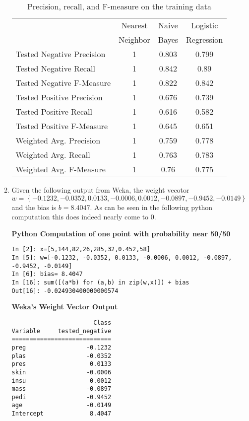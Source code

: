 \documentclass[12pt]{article}
\begin{document}
\begin{enumerate}
\begin{enumerate}
\begin{table}[htdp]
\caption{Precision, recall, and F-measure on the training data}
\begin{center}
\begin{tabular}{l||c|c|c|}
               & Nearest & Naive & Logistic  \\
               & Neighbor &  Bayes & Regression  \\
               \hline
Tested Negative Precision & 1 & 0.803 & 0.799 \\
Tested Negative Recall &1  &  0.842 & 0.89 \\
Tested Negative F-Measure &  1& 0.822 & 0.842 \\
Tested Positive Precision & 1 & 0.676 & 0.739 \\
Tested Positive Recall &1  & 0.616 & 0.582 \\
Tested Positive F-Measure &  1 & 0.645 & 0.651 \\
Weighted Avg. Precision & 1 & 0.759 & 0.778\\
Weighted Avg. Recall & 1 & 0.763 & 0.783 \\
Weighted Avg. F-Measure & 1  & 0.76  &  0.775 \\
\end{tabular}
\end{center}
\label{tab:parta}
\end{table}%


\item %
Given the following output from Weka, the weight vecotor \[w=\left\{ -0.1232, -0.0352,   0.0133,  -0.0006,  0.0012, -0.0897,  -0.9452, -0.0149 \right\}\] and the bias is $b=8.4047$. As can be seen in the following python computation this does indeed nearly come to 0.

{\bf Python Computation of one point with probability near 50/50}
\begin{verbatim}
In [2]: x=[5,144,82,26,285,32,0.452,58]
In [5]: w=[-0.1232, -0.0352, 0.0133, -0.0006, 0.0012, -0.0897, -0.9452, -0.0149]
In [6]: bias= 8.4047
In [16]: sum([(a*b) for (a,b) in zip(w,x)]) + bias
Out[16]: -0.024930400000000574
\end{verbatim}

{\bf Weka's Weight Vector Output}
\begin{verbatim}
                       Class
Variable     tested_negative
============================
preg                 -0.1232
plas                 -0.0352
pres                  0.0133
skin                 -0.0006
insu                  0.0012
mass                 -0.0897
pedi                 -0.9452
age                  -0.0149
Intercept             8.4047
\end{verbatim}




\end{enumerate}
\end{enumerate}
\end{document}
